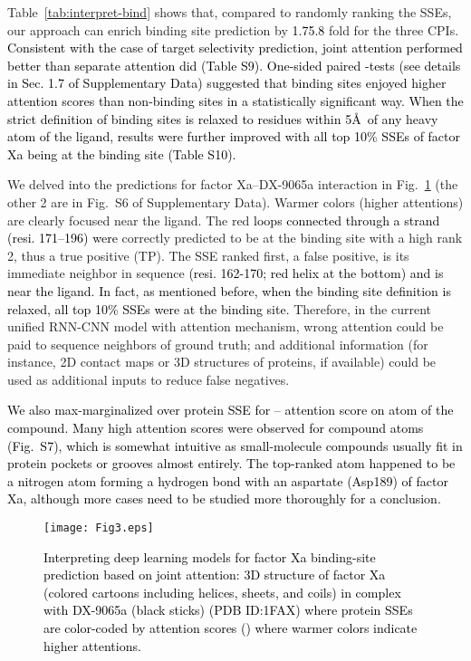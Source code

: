 \documentclass[nocrop]{bioinfo}
\newcommand{\red}[1]{\textcolor{black}{#1}}
\begin{document}
Table~\ref{tab:interpret-bind} shows that, compared to randomly ranking the SSEs, our approach can enrich binding site prediction by \red{1.7}\red{5.8} fold for the three CPIs. \red{Consistent with the case of target selectivity prediction, joint attention performed better than separate attention did (Table S9). One-sided paired -tests (see details in Sec. 1.7 of Supplementary Data) suggested that binding sites enjoyed higher attention scores than non-binding sites in a statistically significant way. When the strict definition of binding sites is relaxed to residues within 5\AA\ of any heavy atom of the ligand, results were further improved with all top 10\% SSEs of factor Xa being at the binding site (Table S10).}


We delved into the predictions for factor Xa--DX-9065a interaction in Fig.~\ref{fig:1fax}  (the other 2 are in Fig.~S6 of Supplementary Data). Warmer colors (higher attentions) are clearly focused near the ligand. The red \red{loops connected through a  strand (resi. 171--196) were} correctly predicted to be at the binding site with a high rank 2, thus a true positive  (TP).  The SSE ranked first, a false positive, is its immediate neighbor in sequence \red{(resi. 162-170; red helix at the bottom) and is near the ligand. In fact, as mentioned before, when the binding site definition is relaxed, all top 10\% SSEs were at the binding site.  } Therefore, in the current unified RNN-CNN model with attention mechanism, wrong attention could be paid to sequence neighbors of ground truth; and additional information  (for instance, 2D contact maps or 3D structures of proteins, if available) could be used as additional inputs to reduce false negatives. 

\red{We also max-marginalized  over protein SSE  for  -- attention score on atom  of the compound. Many high attention scores were observed for compound atoms (Fig.~S7), which is somewhat intuitive as small-molecule compounds usually fit in protein pockets or grooves almost entirely. The top-ranked atom happened to be a nitrogen atom forming a hydrogen bond with an aspartate (Asp189) of factor Xa, although more cases need to be studied more thoroughly for a conclusion.}  


\begin{figure}[!htb]
    \vspace{-2em}
    \centering
    \texttt{[image: Fig3.eps]}
        \vspace{-2em}
    \caption{\red{Interpreting deep learning models for factor Xa binding-site prediction based on joint attention: 3D structure of factor Xa  (colored cartoons including helices, sheets, and coils) in complex with DX-9065a  (black sticks)  (PDB ID:1FAX) where protein SSEs are color-coded by attention scores  () where warmer colors indicate higher attentions.}}
    \label{fig:1fax}
    \vspace{-2em}
\end{figure}
\end{document}
